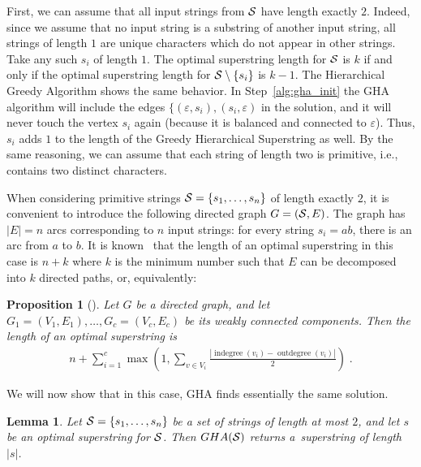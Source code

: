 \documentclass[11pt]{article}
\newtheorem{lemma}{Lemma}
\newtheorem{proposition}{Proposition}
\DeclareMathOperator{\indegree}{indegree}
\DeclareMathOperator{\outdegree}{outdegree}
\begin{document}
First, we can assume that all input strings from ${\cal S}$ have length exactly $2$. Indeed, since we assume that no input string is a substring of another input string, all strings of length $1$ are unique characters which do not appear in other strings. Take any such $s_i$ of length $1$. The optimal superstring length for ${\cal S}$ is $k$ if and only if the optimal superstring length for ${\cal S}\setminus\{s_i\}$ is $k-1$. The Hierarchical Greedy Algorithm shows the same behavior. In Step~\ref{alg:gha_init} the GHA algorithm will include the edges $\{(\varepsilon, s_i), (s_i, \varepsilon)$ in the solution, and it will never touch the vertex $s_i$ again (because it is balanced and connected to $\varepsilon$). Thus, $s_i$ adds $1$ to the length of the Greedy Hierarchical Superstring as well. By the same reasoning, we can assume that each string of length two is primitive, i.e., contains two distinct characters.

When considering primitive strings ${\cal S}=\{s_1,\ldots,s_n\}$ of length exactly $2$, it is convenient to introduce the following directed graph $G=({\cal S}, E)$. The graph has $|E|=n$ arcs corresponding to $n$ input strings: for every string $s_i=ab$, there is an arc from $a$ to $b$. It is known~\cite{GMS1980} that the length of an optimal superstring in this case is $n+k$ where $k$ is the minimum number such that $E$ can be decomposed into $k$ directed paths, or, equivalently:
\begin{proposition}[\cite{GMS1980}]
Let $G$ be a directed graph, and let $G_1=(V_1,E_1),\ldots,G_c=(V_c,E_c)$ be its weakly connected components. Then the length of an optimal superstring is
\begin{align}
\label{eq:gms}
n + \sum_{i=1}^{c} {\max\left( 1, \sum_{v \in V_i}{ \frac{ |\indegree(v_i) - \outdegree(v_i)|}{2} }\right)} \; .
\end{align}
\end{proposition}

We will now show that in this case, GHA finds essentially the same solution.

\begin{lemma}
Let ${\cal S}=\{s_1,\ldots,s_n\}$ be a set of strings of length at most $2$, and let $s$ be an optimal superstring for ${\cal S}$. Then $GHA({\cal S})$ returns a~superstring of length~$|s|$. 
\end{lemma}
\end{document}
